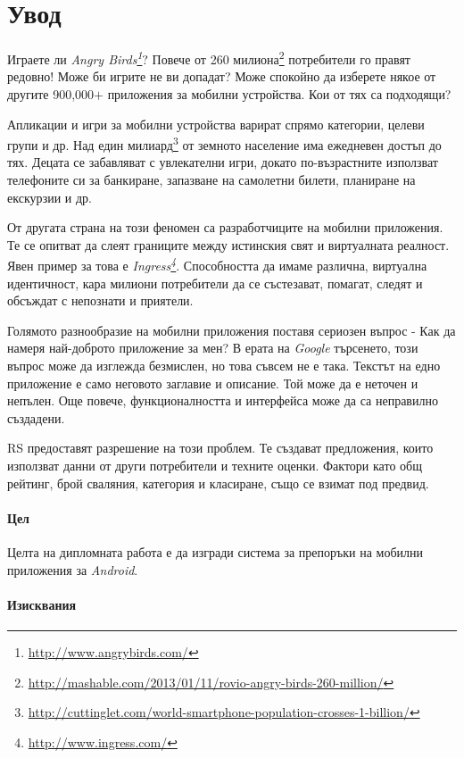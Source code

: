 \chapter*{Увод}

	Играете ли \emph{Angry Birds\footnote{\url{http://www.angrybirds.com/}}}? Повече от 260 милиона\footnote{\url{http://mashable.com/2013/01/11/rovio-angry-birds-260-million/}} потребители го правят редовно! Може би игрите не ви допадат? Може спокойно да изберете някое от другите 900,000$+$ приложения за мобилни устройства. Кои от тях са подходящи?
	
	Апликации и игри за мобилни устройства варират спрямо категории, целеви групи и др. Над един милиард\footnote{\url{http://cuttinglet.com/world-smartphone-population-crosses-1-billion/}} от земното население има ежедневен достъп до тях. Децата се забавляват с увлекателни игри, докато по-възрастните използват телефоните си за банкиране, запазване на самолетни билети, планиране на екскурзии и др.
	
	От другата страна на този феномен са разработчиците на мобилни приложения. Те се опитват да слеят границите между истинския свят и виртуалната реалност. Явен пример за това е \emph{Ingress\footnote{\url{http://www.ingress.com/}}}. Способността да имаме различна, виртуална идентичност, кара милиони потребители да се състезават, помагат, следят и обсъждат с непознати и приятели.
	
	Голямото разнообразие на мобилни приложения поставя сериозен въпрос - Как да намеря най-доброто приложение за мен? В ерата на \emph{Google} търсенето, този въпрос може да изглежда безмислен, но това съвсем не е така. Текстът на едно приложение е само неговото заглавие и описание. Той може да е неточен и непълен. Още повече, функционалността и интерфейса може да са неправилно създадени.
	
	\ac{RS} предоставят разрешение на този проблем. Те създават предложения, които използват данни от други потребители и техните оценки. Фактори като общ рейтинг, брой сваляния, категория и класиране, също се взимат под предвид.

	\subsubsection{Цел}
	
		Целта на дипломната работа е да изгради система за препоръки на мобилни приложения за \emph{Android}.

	\subsubsection{Изисквания}

